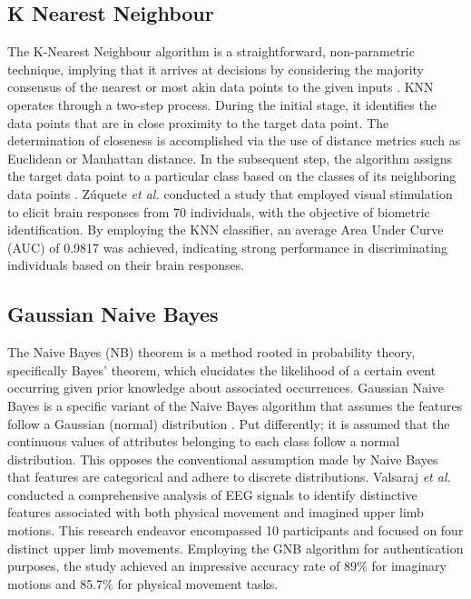 {\subsection{K Nearest Neighbour}
The K-Nearest Neighbour algorithm is a straightforward, non-parametric technique, implying that it arrives at decisions by considering the majority consensus of the nearest or most akin data points to the given inputs \cite{survey_brain_biometrics}. KNN operates through a two-step process. During the initial stage, it identifies the data points that are in close proximity to the target data point. The determination of closeness is accomplished via the use of distance metrics such as Euclidean or Manhattan distance. In the subsequent step, the algorithm assigns the target data point to a particular class based on the classes of its neighboring data points \cite{ghosh2023automatic}. Zúquete \textit{et al.} \cite{zuquete2010biometric} conducted a study that employed visual stimulation to elicit brain responses from 70 individuals, with the objective of biometric identification. By employing the KNN classifier, an average Area Under Curve (AUC) of 0.9817 was achieved, indicating strong performance in discriminating individuals based on their brain responses.  

\subsection{Gaussian Naive Bayes}
The Naive Bayes (NB) theorem is a method rooted in probability theory, specifically Bayes' theorem, which elucidates the likelihood of a certain event occurring given prior knowledge about associated occurrences. Gaussian Naive Bayes is a specific variant of the Naive Bayes algorithm that assumes the features follow a Gaussian (normal) distribution \cite{jahromi2017non}. Put differently; it is assumed that the continuous values of attributes belonging to each class follow a normal distribution. This opposes the conventional assumption made by Naive Bayes that features are categorical and adhere to discrete distributions. Valsaraj \textit{et al.} \cite{valsaraj2020motor} conducted a comprehensive analysis of EEG signals to identify distinctive features associated with both physical movement and imagined upper limb motions. This research endeavor encompassed 10 participants and focused on four distinct upper limb movements. Employing the GNB algorithm for authentication purposes, the study achieved an impressive accuracy rate of 89$\%$ for imaginary motions and 85.7$\%$ for physical movement tasks. 

}
